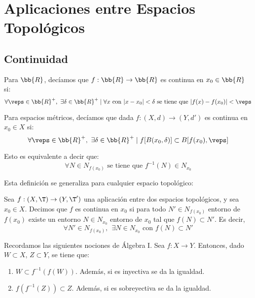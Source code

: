 \chapter{Aplicaciones entre Espacios Topológicos}

\section{Continuidad}

Para $\bb{R}$, decíamos que $f:\bb{R}\to \bb{R}$ es continua en $x_0\in \bb{R}$ si:
\begin{equation*}
    \forall \veps\in \bb{R}^+,~\exists \delta\in \bb{R}^+ \mid \forall x \text{ con } |x-x_0|<\delta \text{ se tiene que } |f(x)-f(x_0)|<\veps
\end{equation*}

Para espacios métricos, decíamos que dada $f:(X,d)\to (Y,d')$ es continua en $x_0\in X$ si:
\begin{equation*}
    \forall \veps\in \bb{R}^+,~\exists \delta\in \bb{R}^+ \mid f[B(x_0,\delta)]\subset B[f(x_0),\veps]
\end{equation*}

Esto es equivalente a decir que:
\begin{equation*}
    \forall N\in N_{f(x_0)} \text{ se tiene que } f^{-1}(N)\in N_{x_0}
\end{equation*}


Esta definición se generaliza para cualquier espacio topológico:
\begin{definicion}[Continuidad]
    Sea $f:(X,\T)\to (Y,\T')$ una aplicación entre dos espacios topológicos, y sea $x_0\in X$. Decimos que $f$ es continua en $x_0$ si para todo $N'\in N_{f(x_0)}$ entorno de $f(x_0)$ existe un entorno $N\in N_{x_0}$ entorno de $x_0$ tal que $f(N)\subset N'$. Es decir,
    \begin{equation*}
        \forall N'\in N_{f(x_0)},~~\exists N\in N_{x_0} \text{ con } f(N)\subset N'
    \end{equation*}
\end{definicion}

\begin{observacion}
    Recordamos las siguientes nociones de Álgebra I. Sea $f:X\to Y$. Entonces, dado $W\subset X$, $Z\subset Y$, se tiene que:
    \begin{enumerate}
        \item $W\subset f^{-1}(f(W))$. Además, si es inyectiva se da la igualdad.

        \item $f(f^{-1}(Z))\subset Z$. Además, si es sobreyectiva se da la igualdad.
    \end{enumerate}
\end{observacion}


